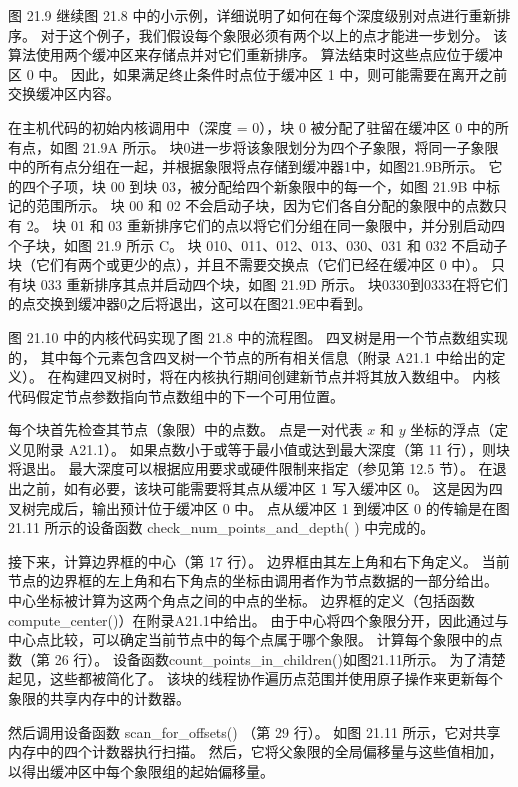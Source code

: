 图 21.9 继续图 21.8 中的小示例，详细说明了如何在每个深度级别对点进行重新排序。 
对于这个例子，我们假设每个象限必须有两个以上的点才能进一步划分。 该算法使用两个缓冲区来存储点并对它们重新排序。 
算法结束时这些点应位于缓冲区 0 中。 因此，如果满足终止条件时点位于缓冲区 1 中，则可能需要在离开之前交换缓冲区内容。

在主机代码的初始内核调用中（深度 = 0），块 0 被分配了驻留在缓冲区 0 中的所有点，如图 21.9A 所示。 
块0进一步将该象限划分为四个子象限，将同一子象限中的所有点分组在一起，并根据象限将点存储到缓冲器1中，如图21.9B所示。 
它的四个子项，块 00 到块 03，被分配给四个新象限中的每一个，如图 21.9B 中标记的范围所示。 
块 00 和 02 不会启动子块，因为它们各自分配的象限中的点数只有 2。
块 01 和 03 重新排序它们的点以将它们分组在同一象限中，并分别启动四个子块，如图 21.9 所示 C。 
块 010、011、012、013、030、031 和 032 不启动子块（它们有两个或更少的点），并且不需要交换点（它们已经在缓冲区 0 中）。 
只有块 033 重新排序其点并启动四个块，如图 21.9D 所示。 
块0330到0333在将它们的点交换到缓冲器0之后将退出，这可以在图21.9E中看到。

图 21.10 中的内核代码实现了图 21.8 中的流程图。 四叉树是用一个节点数组实现的，
其中每个元素包含四叉树一个节点的所有相关信息（附录 A21.1 中给出的定义）。 
在构建四叉树时，将在内核执行期间创建新节点并将其放入数组中。 内核代码假定节点参数指向节点数组中的下一个可用位置。

每个块首先检查其节点（象限）中的点数。 点是一对代表 $x$ 和 $y$ 坐标的浮点（定义见附录 A21.1）。 
如果点数小于或等于最小值或达到最大深度（第 11 行），则块将退出。 
最大深度可以根据应用要求或硬件限制来指定（参见第 12.5 节）。 
在退出之前，如有必要，该块可能需要将其点从缓冲区 1 写入缓冲区 0。 
这是因为四叉树完成后，输出预计位于缓冲区 0 中。 
点从缓冲区 1 到缓冲区 0 的传输是在图 21.11 所示的设备函数 check\_num\_points\_and\_depth( ) 中完成的。

接下来，计算边界框的中心（第 17 行）。 边界框由其左上角和右下角定义。 
当前节点的边界框的左上角和右下角点的坐标由调用者作为节点数据的一部分给出。 中心坐标被计算为这两个角点之间的中点的坐标。 
边界框的定义（包括函数compute\_center()）在附录A21.1中给出。 
由于中心将四个象限分开，因此通过与中心点比较，可以确定当前节点中的每个点属于哪个象限。 计算每个象限中的点数（第 26 行）。 
设备函数count\_points\_in\_children()如图21.11所示。 为了清楚起见，这些都被简化了。 
该块的线程协作遍历点范围并使用原子操作来更新每个象限的共享内存中的计数器。

然后调用设备函数 scan\_for\_offsets() （第 29 行）。 如图 21.11 所示，它对共享内存中的四个计数器执行扫描。 
然后，它将父象限的全局偏移量与这些值相加，以得出缓冲区中每个象限组的起始偏移量。

